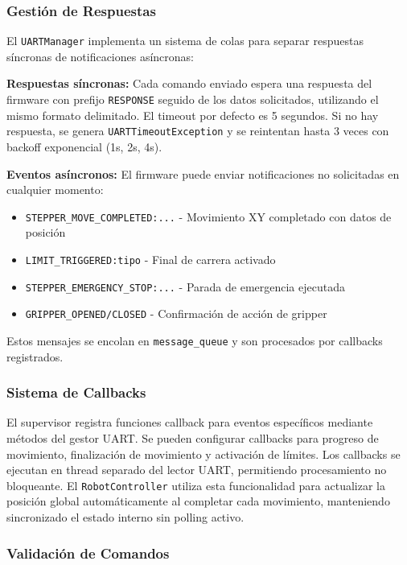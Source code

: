 \subsubsection{Gestión de Respuestas}

El \texttt{UARTManager} implementa un sistema de colas para separar respuestas síncronas de notificaciones asíncronas:

\textbf{Respuestas síncronas:} Cada comando enviado espera una respuesta del firmware con prefijo \texttt{RESPONSE} seguido de los datos solicitados, utilizando el mismo formato delimitado. El timeout por defecto es 5 segundos. Si no hay respuesta, se genera \texttt{UARTTimeoutException} y se reintentan hasta 3 veces con backoff exponencial (1s, 2s, 4s).

\textbf{Eventos asíncronos:} El firmware puede enviar notificaciones no solicitadas en cualquier momento:
\begin{itemize}[label=$\bullet$]
    \item \texttt{STEPPER\_MOVE\_COMPLETED:...} - Movimiento XY completado con datos de posición
    \item \texttt{LIMIT\_TRIGGERED:tipo} - Final de carrera activado
    \item \texttt{STEPPER\_EMERGENCY\_STOP:...} - Parada de emergencia ejecutada
    \item \texttt{GRIPPER\_OPENED/CLOSED} - Confirmación de acción de gripper
\end{itemize}

Estos mensajes se encolan en \texttt{message\_queue} y son procesados por callbacks registrados.

\subsubsection{Sistema de Callbacks}

El supervisor registra funciones callback para eventos específicos mediante métodos del gestor UART. Se pueden configurar callbacks para progreso de movimiento, finalización de movimiento y activación de límites. Los callbacks se ejecutan en thread separado del lector UART, permitiendo procesamiento no bloqueante. El \texttt{RobotController} utiliza esta funcionalidad para actualizar la posición global automáticamente al completar cada movimiento, manteniendo sincronizado el estado interno sin polling activo.

\subsubsection{Validación de Comandos}

